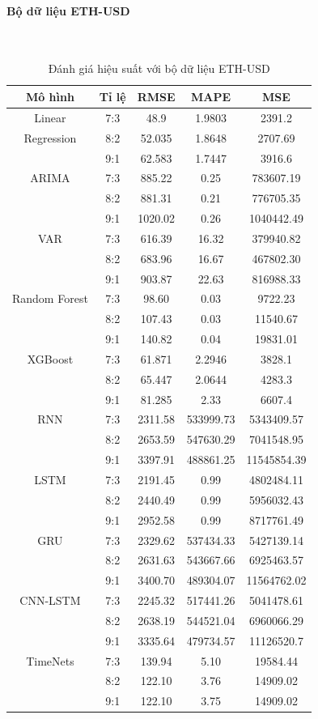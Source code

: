 \documentclass[conference]{IEEEtran}
\begin{document}
\paragraph{\textbf{Bộ dữ liệu ETH-USD}} \mbox{} \\
\begin{table}[H]
 \centering
 \caption{Đánh giá hiệu suất với bộ dữ liệu ETH-USD}
\begin{adjustbox}{width=0.4\textwidth}
\begin{tabular}{|c|c|c|c|c|}
\hline
Mô hình & Tỉ lệ & RMSE & MAPE & MSE \\ \hline
Linear & 7:3 & 48.9 & 1.9803 & 2391.2 \\
Regression & 8:2 & 52.035 & 1.8648 & 2707.69 \\
& 9:1 & 62.583 & 1.7447 & 3916.6 \\ \hline
ARIMA & 7:3 & 885.22 & 0.25 & 783607.19 \\
& 8:2 & 881.31 & 0.21 & 776705.35 \\
& 9:1 & 1020.02 & 0.26 & 1040442.49 \\ \hline
VAR & 7:3 & 616.39 & 16.32 & 379940.82 \\
& 8:2 & 683.96 & 16.67 & 467802.30 \\
& 9:1 &  903.87 & 22.63 & 816988.33 \\ \hline
Random Forest & 7:3 & 98.60 & 0.03 & 9722.23 \\
& 8:2 & 107.43 & 0.03 & 11540.67 \\
& 9:1 & 140.82 & 0.04 & 19831.01 \\ \hline
XGBoost & 7:3 & 61.871 & 2.2946 & 3828.1 \\
& 8:2 & 65.447 & 2.0644 & 4283.3 \\
& 9:1 & 81.285 & 2.33 & 6607.4 \\ \hline
RNN & 7:3 & 2311.58 & 533999.73 & 5343409.57 \\
& 8:2 & 2653.59 & 547630.29 & 7041548.95 \\
& 9:1 & 3397.91 & 488861.25 & 11545854.39 \\ \hline
LSTM & 7:3 & 2191.45 & 0.99 & 4802484.11 \\
& 8:2 & 2440.49 & 0.99 & 5956032.43 \\
& 9:1 & 2952.58 & 0.99 & 8717761.49 \\ \hline
GRU & 7:3 & 2329.62 & 537434.33 & 5427139.14 \\
& 8:2 & 2631.63 & 543667.66 & 6925463.57 \\
& 9:1 & 3400.70 & 489304.07 & 11564762.02 \\ \hline
CNN-LSTM & 7:3 & 2245.32 & 517441.26 & 5041478.61 \\
& 8:2 & 2638.19 & 544521.04 & 6960066.29 \\
& 9:1 & 3335.64 & 479734.57 & 11126520.7 \\ \hline
TimeNets & 7:3 & 139.94 & 5.10 & 19584.44 \\
& 8:2 & 122.10 & 3.76 & 14909.02 \\
& 9:1 & 122.10 & 3.75 & 14909.02 \\ \hline
\end{tabular}
\end{adjustbox}
\end{table}
\end{document}
